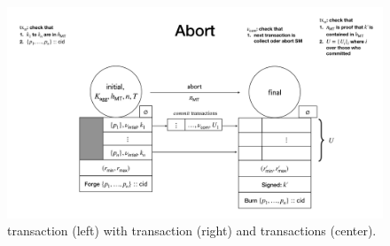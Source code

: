 \begin{figure}[t!]

  \centering

  \includegraphics[width=\textwidth/2-2em,trim=350 20 240 300,
  clip]{figures/SM_initial_final.pdf}
    
  \caption{\mtxInit{} transaction (left) with \mtxAbort{} transaction
    (right) and \mtxCom{} transactions (center).}
  \label{fig:SM_initial_final}

\end{figure}



